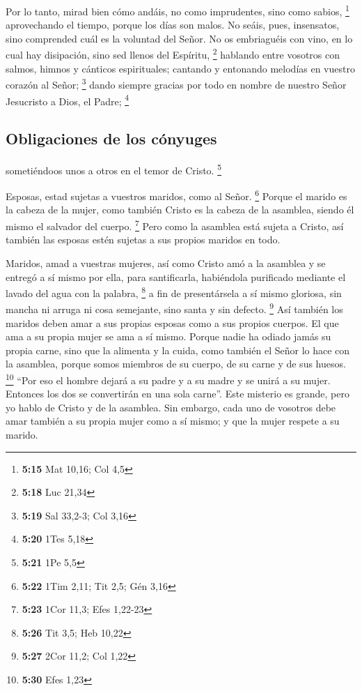\begin{paracol}{2}
 Por lo tanto, mirad bien cómo andáis, no como
imprudentes, sino como sabios, \footnote{\textbf{5:15} Mat 10,16; Col
  4,5}  aprovechando el tiempo, porque los días son
malos.  No seáis, pues, insensatos, sino comprended cuál
es la voluntad del Señor.  No os embriaguéis con vino, en
lo cual hay disipación, sino sed llenos del Espíritu, \footnote{\textbf{5:18}
  Luc 21,34}  hablando entre vosotros con salmos, himnos
y cánticos espirituales; cantando y entonando melodías en vuestro
corazón al Señor; \footnote{\textbf{5:19} Sal 33,2-3; Col 3,16}
 dando siempre gracias por todo en nombre de nuestro
Señor Jesucristo a Dios, el Padre; \footnote{\textbf{5:20} 1Tes 5,18}

\hypertarget{obligaciones-de-los-cuxf3nyuges}{%
\subsection{Obligaciones de los
cónyuges}\label{obligaciones-de-los-cuxf3nyuges}}

 sometiéndoos unos a otros en el temor de Cristo.
\footnote{\textbf{5:21} 1Pe 5,5}

 Esposas, estad sujetas a vuestros maridos, como al
Señor. \footnote{\textbf{5:22} 1Tim 2,11; Tit 2,5; Gén 3,16}
 Porque el marido es la cabeza de la mujer, como también
Cristo es la cabeza de la asamblea, siendo él mismo el salvador del
cuerpo. \footnote{\textbf{5:23} 1Cor 11,3; Efes 1,22-23} 
Pero como la asamblea está sujeta a Cristo, así también las esposas
estén sujetas a sus propios maridos en todo.

 Maridos, amad a vuestras mujeres, así como Cristo amó a
la asamblea y se entregó a sí mismo por ella,  para
santificarla, habiéndola purificado mediante el lavado del agua con la
palabra, \footnote{\textbf{5:26} Tit 3,5; Heb 10,22}  a
fin de presentársela a sí mismo gloriosa, sin mancha ni arruga ni cosa
semejante, sino santa y sin defecto. \footnote{\textbf{5:27} 2Cor 11,2;
  Col 1,22}  Así también los maridos deben amar a sus
propias esposas como a sus propios cuerpos. El que ama a su propia mujer
se ama a sí mismo.  Porque nadie ha odiado jamás su
propia carne, sino que la alimenta y la cuida, como también el Señor lo
hace con la asamblea,  porque somos miembros de su
cuerpo, de su carne y de sus huesos. \footnote{\textbf{5:30} Efes 1,23}
 ``Por eso el hombre dejará a su padre y a su madre y se
unirá a su mujer. Entonces los dos se convertirán en una sola carne''.
 Este misterio es grande, pero yo hablo de Cristo y de la
asamblea.  Sin embargo, cada uno de vosotros debe amar
también a su propia mujer como a sí mismo; y que la mujer respete a su
marido.


\end{paracol}
